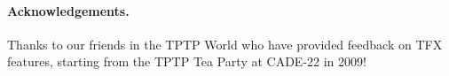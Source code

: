 \documentclass{easychair}
\begin{document}
\paragraph{Acknowledgements.}
Thanks to our friends in the TPTP World who have provided feedback on TFX
features, starting from the TPTP Tea Party at CADE-22 in 2009!



\end{document}

